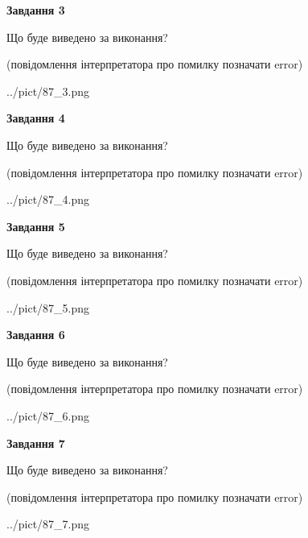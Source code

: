 \documentclass[12pt, ukrainian]{article}
\begin{document}
{\begin {large}
{\begin {center}\textbf{Завдання 3}\end {center}}\par
Що буде виведено за виконання?\par
 (повідомлення інтерпретатора про помилку позначати error)\par
\begin{center}
	{../pict/87_3.png}
\end{center}
\newpage

{\begin {center}\textbf{Завдання 4}\end {center}}\par
Що буде виведено за виконання?\par
 (повідомлення інтерпретатора про помилку позначати error)\par
\begin{center}
	{../pict/87_4.png}
\end{center}
\newpage

{\begin {center}\textbf{Завдання 5}\end {center}}\par
Що буде виведено за виконання?\par
 (повідомлення інтерпретатора про помилку позначати error)\par
\begin{center}
	{../pict/87_5.png}
\end{center}
\newpage

{\begin {center}\textbf{Завдання 6}\end {center}}\par
Що буде виведено за виконання?\par
 (повідомлення інтерпретатора про помилку позначати error)\par
\begin{center}
	{../pict/87_6.png}
\end{center}
\newpage

{\begin {center}\textbf{Завдання 7}\end {center}}\par
Що буде виведено за виконання?\par
 (повідомлення інтерпретатора про помилку позначати error)\par
\begin{center}
	{../pict/87_7.png}
\end{center}
\newpage


\end{large}}
\end{document}
